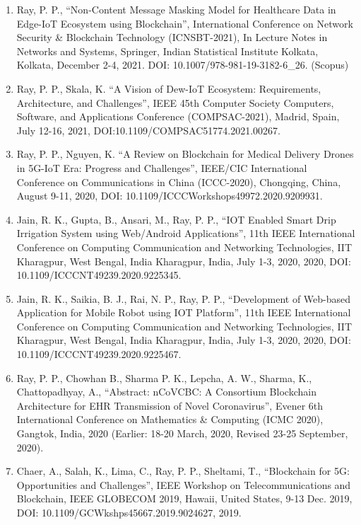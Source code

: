 \documentclass[11pt,a4paper]{moderncv}
\begin{document}
\begin{adjustwidth}{6em}{0pt}
\begin{enumerate}
	\item Ray, P. P., “Non-Content Message Masking Model for Healthcare Data in Edge-IoT Ecosystem using Blockchain”, International Conference on Network Security \& Blockchain Technology (ICNSBT-2021), In Lecture Notes in Networks and Systems, Springer, Indian Statistical Institute Kolkata, Kolkata, December 2-4, 2021. DOI: 10.1007/978-981-19-3182-6\_26. (Scopus)  
	
	\item Ray, P. P., Skala, K. “A Vision of Dew-IoT Ecosystem: Requirements, Architecture, and Challenges”, IEEE 45th Computer Society Computers, Software, and Applications Conference (COMPSAC-2021), Madrid, Spain, July 12-16, 2021, DOI:10.1109/COMPSAC51774.2021.00267.
	
	\item Ray, P. P., Nguyen, K. “A Review on Blockchain for Medical Delivery Drones in 5G-IoT Era: Progress and Challenges”, IEEE/CIC International Conference on Communications in China (ICCC-2020), Chongqing, China, August 9-11, 2020, DOI: 10.1109/ICCCWorkshops49972.2020.9209931.
	
	\item Jain, R. K., Gupta, B., Ansari, M., Ray, P. P., “IOT Enabled Smart Drip Irrigation System using Web/Android Applications”, 11th IEEE International Conference on Computing Communication and Networking Technologies, IIT Kharagpur, West Bengal, India Kharagpur, India, July 1-3, 2020, 2020, DOI: 10.1109/ICCCNT49239.2020.9225345.
	
	\item Jain, R. K., Saikia, B. J., Rai, N. P., Ray, P. P., “Development of Web-based Application for Mobile Robot using IOT Platform”, 11th IEEE International Conference on Computing Communication and Networking Technologies, IIT Kharagpur, West Bengal, India Kharagpur, India, July 1-3, 2020, 2020, DOI: 10.1109/ICCCNT49239.2020.9225467.
	
	\item Ray, P. P., Chowhan B., Sharma P. K., Lepcha, A. W., Sharma, K., Chattopadhyay, A., “Abstract: nCoVCBC: A Consortium Blockchain Architecture for EHR Transmission of Novel Coronavirus”, Evener 6th International Conference on Mathematics \& Computing (ICMC 2020), Gangtok, India, 2020 (Earlier: 18-20 March, 2020, Revised 23-25 September, 2020). 
	
	\item Chaer, A., Salah, K., Lima, C., Ray, P. P., Sheltami, T., “Blockchain for 5G: Opportunities and Challenges”, IEEE Workshop on Telecommunications and Blockchain, IEEE GLOBECOM 2019, Hawaii, United States, 9-13 Dec. 2019, DOI: 10.1109/GCWkshps45667.2019.9024627, 2019. 
	

\end{enumerate}
\end{adjustwidth}
\end{document}
